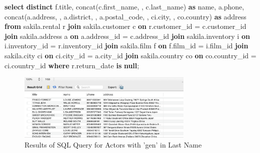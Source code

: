 \documentclass[12pt, french]{article}
\newenvironment{Shaded}{}{}
\newcommand{\KeywordTok}[1]{\textcolor[rgb]{0.00,0.44,0.13}{\textbf{{#1}}}}
\newcommand{\StringTok}[1]{\textcolor[rgb]{0.25,0.44,0.63}{{#1}}}
\newcommand{\FunctionTok}[1]{\textcolor[rgb]{0.02,0.16,0.49}{{#1}}}
\newcommand{\NormalTok}[1]{{#1}}
\newcommand{\OperatorTok}[1]{\textcolor[rgb]{0.40,0.40,0.40}{{#1}}}
\begin{document}
\begin{Shaded}
\begin{Highlighting}[]
\KeywordTok{select} \KeywordTok{distinct}\NormalTok{ f.title, }\FunctionTok{concat}\NormalTok{(c.first\_name, }\StringTok{\textquotesingle{} \textquotesingle{}}\NormalTok{, c.last\_name) }\KeywordTok{as}\NormalTok{ name, a.phone, }\FunctionTok{concat}\NormalTok{(a.address, }\StringTok{\textquotesingle{} \textquotesingle{}}\NormalTok{, a.district, }\StringTok{\textquotesingle{} \textquotesingle{}}\NormalTok{, a.postal\_code, }\StringTok{\textquotesingle{} \textquotesingle{}}\NormalTok{, ci.city, }\StringTok{\textquotesingle{} \textquotesingle{}}\NormalTok{, co.country) }\KeywordTok{as}\NormalTok{ address}
\KeywordTok{from}\NormalTok{ sakila.rental r}
    \KeywordTok{join}\NormalTok{ sakila.customer c }
        \KeywordTok{on}\NormalTok{ r.customer\_id }\OperatorTok{=}\NormalTok{ c.customer\_id}
    \KeywordTok{join}\NormalTok{ sakila.address a}
        \KeywordTok{on}\NormalTok{ a.address\_id }\OperatorTok{=}\NormalTok{ c.address\_id}
    \KeywordTok{join}\NormalTok{ sakila.inventory i}
        \KeywordTok{on}\NormalTok{ i.inventory\_id }\OperatorTok{=}\NormalTok{ r.inventory\_id}
    \KeywordTok{join}\NormalTok{ sakila.film f}
        \KeywordTok{on}\NormalTok{ f.film\_id }\OperatorTok{=}\NormalTok{ i.film\_id}
    \KeywordTok{join}\NormalTok{ sakila.city ci }
        \KeywordTok{on}\NormalTok{ ci.city\_id }\OperatorTok{=}\NormalTok{ a.city\_id}
    \KeywordTok{join}\NormalTok{ sakila.country co}
        \KeywordTok{on}\NormalTok{ co.country\_id }\OperatorTok{=}\NormalTok{ ci.country\_id}
\KeywordTok{where}\NormalTok{ r.return\_date }\KeywordTok{is} \KeywordTok{null}\NormalTok{;}
\end{Highlighting}
\end{Shaded}


\begin{figure}[H] %
    \centering
    \includegraphics[width=0.75\textwidth]{res/Q9.png}
    \caption{Results of SQL Query for Actors with 'gen' in Last Name}
    \label{fig:actors_with_gen}
\end{figure}
\end{document}
